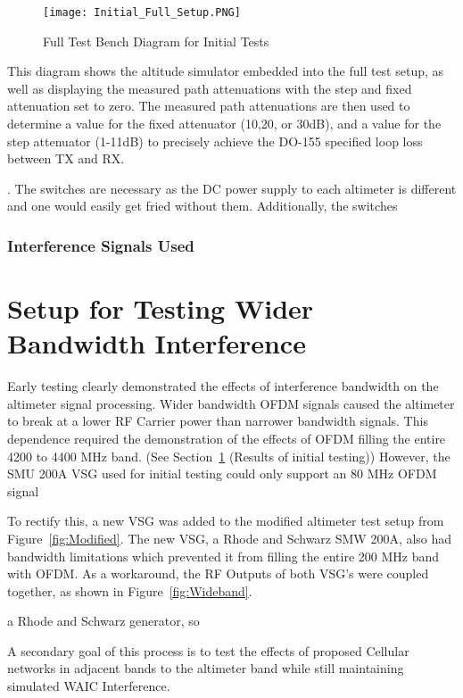\begin{figure}[ht]
\centering
\texttt{[image: Initial\_Full\_Setup.PNG]}
\caption[]{Full Test Bench Diagram for Initial Tests}

\label{fig:Initial}

\end{figure}


This diagram shows the altitude simulator  embedded into the full test setup, as well as displaying the measured path attenuations with the step and fixed attenuation set to zero. The measured path attenuations are then used to determine a value for the fixed attenuator (10,20, or 30dB), and a value for the step attenuator (1-11dB) to precisely achieve the DO-155 specified loop loss between TX and RX. 

. The switches are necessary as the DC power supply to each altimeter is different and one would easily get fried without them. Additionally, the switches 

\subsubsection{Interference Signals Used}

\section{Setup for Testing Wider Bandwidth Interference}
Early testing clearly demonstrated the effects of interference bandwidth on the altimeter signal processing. Wider bandwidth OFDM signals caused the altimeter to break at a lower RF Carrier power than narrower bandwidth signals. This dependence required the demonstration of the effects of OFDM filling the entire 4200 to 4400 MHz band. (See Section~\ref{} (Results of initial testing)) However, the SMU 200A VSG used for initial testing could only support an 80 MHz OFDM signal 

To rectify this, a new VSG was added to the modified altimeter test setup from Figure~\ref{fig:Modified}. The new VSG, a Rhode and Schwarz SMW 200A, also had bandwidth limitations which prevented it from filling the entire 200 MHz band with OFDM. As a workaround, the RF Outputs of both VSG's were coupled together, as shown in Figure~\ref{fig:Wideband}.

a Rhode and Schwarz generator, so 

 A secondary goal of this process is to test the effects of proposed Cellular networks in adjacent bands to the altimeter band while still maintaining simulated WAIC Interference. 

